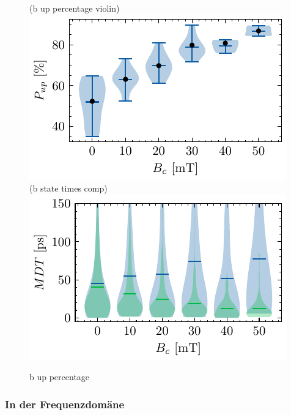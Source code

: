 \documentclass[main.tex]{subfiles}
\begin{document}
\begin{figure}[H]
    \centering
    \subcaptionbox(b up percentage violin\label{fig:bz-up-percentage-violin}){\includegraphics{bilder/plots/max_Bz/up_percentage_violin.pdf}}
    \subcaptionbox(b state times comp\label{fig:bz-state-times-comp}){\includegraphics{bilder/plots/max_Bz/state_times_comp.pdf}}
    \caption{b up percentage}\label{fig:bz-violin}
\end{figure}

\subsubsection{In der Frequenzdomäne}
\end{document}

